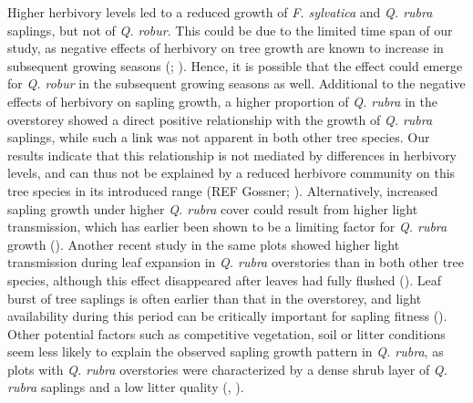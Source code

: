 \documentclass[b5paper,10pt]{book} %
\begin{document}
	\medskip

	Higher herbivory levels led to a reduced growth of \textit{F. sylvatica} and \textit{Q. rubra} saplings, but not of \textit{Q. robur}. This could be due to the limited time span of our study, as negative effects of herbivory on tree growth are known to increase in subsequent growing seasons (\citealt{Marquis1994}; \citealt{Mooney2007}). Hence, it is possible that the effect could emerge for \textit{Q. robur} in the subsequent growing seasons as well. Additional to the negative effects of herbivory on sapling growth, a higher proportion of \textit{Q. rubra} in the overstorey showed a direct positive relationship with the growth of \textit{Q. rubra} saplings, while such a link was not apparent in both other tree species. Our results indicate that this relationship is not mediated by differences in herbivory levels, and can thus not be explained by a reduced herbivore community on this tree species in its introduced range (REF Gossner; \citealt{Branco2015}). Alternatively, increased sapling growth under higher \textit{Q. rubra} cover could result from higher light transmission, which has earlier been shown to be a limiting factor for \textit{Q. rubra} growth (\citealt{Dey1996}). Another recent study in the same plots showed higher light transmission during leaf expansion in \textit{Q. rubra} overstories than in both other tree species, although this effect disappeared after leaves had fully flushed (\citealt{Sercu2017}). Leaf burst of tree saplings is often earlier than that in the overstorey, and light availability during this period can be critically important for sapling fitness (\citealt{Augspurger2005}). Other potential factors such as competitive vegetation, soil or litter conditions seem less likely to explain the observed sapling growth pattern in \textit{Q. rubra}, as plots with \textit{Q. rubra} overstories were characterized by a dense shrub layer of \textit{Q. rubra} saplings and a low litter quality (\citealt{DeGroote2017}, \citealt{DeGroote2018}). 

	\medskip
\end{document}
